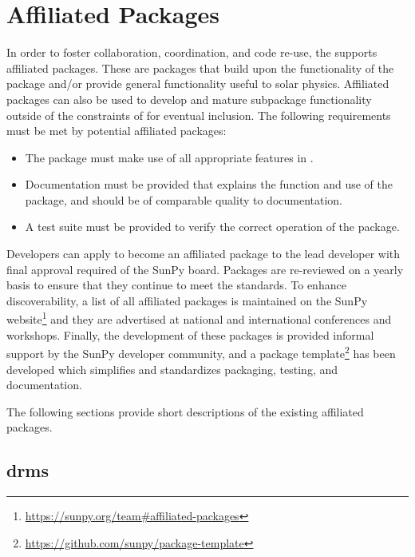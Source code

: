 \section{Affiliated Packages}
\label{sec:affil_package}

In order to foster collaboration, coordination, and code re-use, the \sunpyproj supports affiliated packages.
These are \python packages that build upon the functionality of the \sunpypkg package and/or provide general functionality useful to solar physics.
Affiliated packages can also be used to develop and mature subpackage functionality outside of the constraints of \sunpypkg for eventual inclusion.
The following requirements must be met by potential affiliated packages:
\begin{itemize}
    \item The package must make use of all appropriate features in \sunpypkg.
    \item Documentation must be provided that explains the function and use of the package, and should be of comparable quality to \sunpypkg documentation.
    \item A test suite must be provided to verify the correct operation of the package.
\end{itemize}
Developers can apply to become an affiliated package to the lead developer with final approval required of the SunPy board.
Packages are re-reviewed on a yearly basis to ensure that they continue to meet the standards.
To enhance discoverability, a list of all affiliated packages is maintained on the SunPy website\footnote{\url{https://sunpy.org/team\#affiliated-packages}} and they are advertised at national and international conferences and workshops.
Finally, the development of these packages is provided informal support by the SunPy developer community, and
a package template\footnote{\url{https://github.com/sunpy/package-template}} has been developed which simplifies and standardizes packaging, testing, and documentation.

The following sections provide short descriptions of the existing affiliated packages.

\subsection{drms}
\label{sec:drms}

